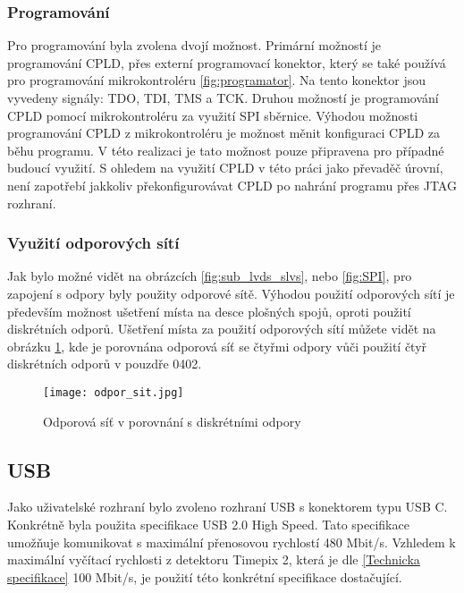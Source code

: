 	\subsubsection{Programování}
	Pro programování byla zvolena dvojí možnost. Primární možností je programování CPLD, přes externí programovací konektor, který se také používá pro programování mikrokontroléru \ref{fig:programator}. Na tento konektor jsou vyvedeny signály: TDO, TDI, TMS a TCK. Druhou možností je programování CPLD pomocí mikrokontroléru za využití SPI sběrnice. Výhodou možnosti programování CPLD z mikrokontroléru je možnost měnit konfiguraci CPLD za běhu programu. V této realizaci je tato možnost pouze připravena pro  případné budoucí využití. S ohledem na využití CPLD v této práci jako převaděč úrovní, není zapotřebí jakkoliv překonfigurovávat CPLD po nahrání programu přes JTAG rozhraní.
	\subsubsection{Využití odporových sítí} %
	Jak bylo možné vidět na obrázcích \ref{fig:sub_lvds_slvs}, nebo \ref{fig:SPI}, pro zapojení s odpory byly použity odporové sítě. Výhodou použití odporových sítí je především možnost ušetření místa na desce plošných spojů, oproti použití diskrétních odporů. Ušetření místa za použití odporových sítí můžete vidět na obrázku \ref{fig:odpor_sit}, kde je porovnána odporová síť se čtyřmi odpory vůči použití čtyř diskrétních odporů v pouzdře 0402.
	\begin{figure}[h!]
		\centering
		\captionsetup{justification=centering}
		\texttt{[image: odpor\_sit.jpg]}
		\caption{Odporová síť v porovnání s diskrétními odpory} 
		\label{fig:odpor_sit}
	\end{figure}
	
	\subsection{USB} %
	\label{USB}
	Jako uživatelské rozhraní bylo zvoleno rozhraní USB s konektorem typu USB C. Konkrétně byla použita specifikace USB 2.0 High Speed. Tato specifikace umožňuje komunikovat s maximální přenosovou rychlostí 480 Mbit/s. Vzhledem k maximální vyčítací rychlosti z detektoru Timepix 2, která je dle \ref{Technicka specifikace} 100 Mbit/s, je použití této konkrétní specifikace dostačující. 
